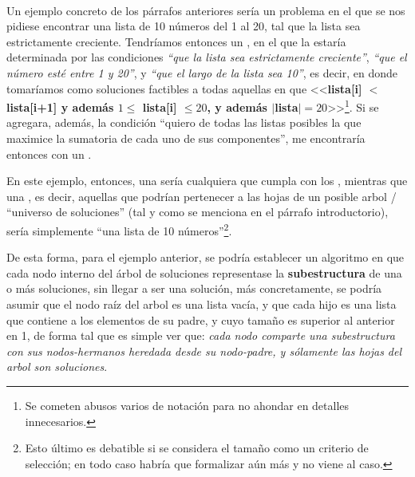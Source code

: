 \documentclass[11pt, a4paper, twoside]{article}
\begin{document}
\begin{paragraph}\


Un ejemplo concreto de los párrafos anteriores sería un problema en el que se
nos pidiese encontrar una lista de 10 números del 1 al 20, tal que la lista sea
estrictamente creciente. Tendríamos entonces un , en el que la  estaría determinada por
las condiciones \emph{``que la lista sea estrictamente creciente''}, \emph{``que el número
esté entre 1 y 20''}, y \emph{``que el largo de la lista sea 10''}, es decir, en donde
tomaríamos como soluciones factibles a todas aquellas en que <<\textbf{lista[i] $<$
lista[i+1] y además $1 \leq $ lista[i] $ \leq 20$, y además $|$lista$|=
20$}>>\footnote{Se cometen abusos varios de notación para no ahondar en detalles
innecesarios.}. Si se agregara, además, la condición ``quiero de todas las listas
posibles la que maximice la sumatoria de cada uno de sus componentes'', me
encontraría entonces con un .

En este ejemplo, entonces, una  sería cualquiera que
cumpla con los , mientras que una , es decir, aquellas que podrían pertenecer a las hojas de
un posible arbol / ``universo de soluciones'' (tal y como se menciona en el párrafo
introductorio), sería simplemente ``una lista de 10 números''\footnote{Esto último es
debatible si se considera el tamaño como un criterio de selección; en todo caso habría
que formalizar aún más y no viene al caso.}.

De esta forma, para el ejemplo anterior, se podría establecer un algoritmo en
que cada nodo interno del árbol de soluciones representase la
\textbf{subestructura} de una o más soluciones, sin llegar a ser una solución,
más concretamente, se podría asumir que el nodo raíz del arbol es una lista
vacía, y que cada hijo es una lista que contiene a los elementos de su padre, y
cuyo tamaño es superior al anterior en 1, de forma tal que es simple ver que: \emph{cada nodo
comparte una subestructura con sus nodos-hermanos heredada desde su nodo-padre,
y sólamente las hojas del arbol son soluciones}.


\end{paragraph}
\end{document}

